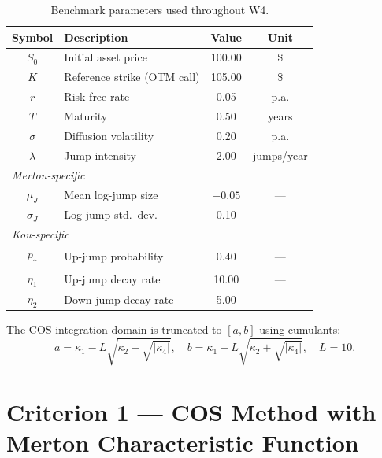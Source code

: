 \documentclass[12pt, a4paper]{article}
\theoremstyle{definition}
\begin{document}
\begin{table}[H]
  \centering
  \caption{Benchmark parameters used throughout W4.}
  \label{tab:params}
  \begin{tabular}{clcc}
    \toprule
    \textbf{Symbol} & \textbf{Description} & \textbf{Value} & \textbf{Unit}\\
    \midrule
    $S_0$      & Initial asset price          & 100.00   & \$\\
    $K$        & Reference strike (OTM call)  & 105.00   & \$\\
    $r$        & Risk-free rate               & 0.05     & p.a.\\
    $T$        & Maturity                     & 0.50     & years\\
    $\sigma$   & Diffusion volatility         & 0.20     & p.a.\\
    $\lambda$  & Jump intensity               & 2.00     & jumps/year\\
    \midrule
    \multicolumn{4}{l}{\textit{Merton-specific}}\\
    $\mu_J$    & Mean log-jump size           & $-0.05$  & —\\
    $\sigma_J$ & Log-jump std.\ dev.          & 0.10     & —\\
    \midrule
    \multicolumn{4}{l}{\textit{Kou-specific}}\\
    $p_{\uparrow}$ & Up-jump probability      & 0.40     & —\\
    $\eta_1$   & Up-jump decay rate           & 10.00    & —\\
    $\eta_2$   & Down-jump decay rate         & 5.00     & —\\
    \bottomrule
  \end{tabular}
\end{table}

The COS integration domain is truncated to $[a,b]$ using cumulants:
\begin{equation}
  a = \kappa_1 - L\sqrt{\kappa_2+\sqrt{|\kappa_4|}},\quad
  b = \kappa_1 + L\sqrt{\kappa_2+\sqrt{|\kappa_4|}},\quad L=10.
\end{equation}

\section{Criterion 1 — COS Method with Merton Characteristic Function}
\end{document}
